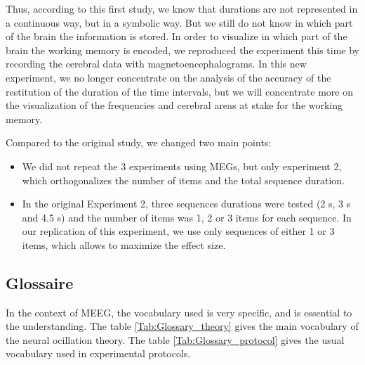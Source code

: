 Thus, according to this first study, we know that durations are not represented in a continuous way, but in a symbolic way. But we still do not know in which part of the brain the information is stored. In order to visualize in which part of the brain the working memory is encoded, we reproduced the experiment this time by recording the cerebral data with magnetoencephalograms. In this new experiment, we no longer concentrate on the analysis of the accuracy of the restitution of the duration of the time intervals, but we will concentrate more on the visualization of the frequencies and cerebral areas at stake for the working memory.

Compared to the original study, we changed two main points:

\begin{itemize}
    \item We did not repeat the 3 experiments using MEGs, but only experiment 2, which orthogonalizes the number of items and the total sequence duration.
    \item In the original Experiment 2, three sequences durations were tested (2 s, 3 s and 4.5 s) and the number of items was 1, 2 or 3 items for each sequence. In our replication of this experiment, we use only sequences of either 1 or 3 items, which allows to maximize the effect size.
\end{itemize}



\subsection{Glossaire}

In the context of MEEG, the vocabulary used is very specific, and is essential to the understanding. The table \ref{Tab:Glossary_theory} gives the main vocabulary of the neural ocillation theory. The table \ref{Tab:Glossary_protocol} gives the usual vocabulary used in experimental protocols.

